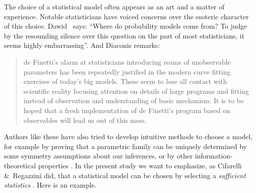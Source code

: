 \documentclass[%
]{frontiersSCNS-nologo} %
\newcommand*{\citey}{\citeyearpar}
\newcommand*{\chap}{ch.} %
\newcommand*{\sect}{\S} %
\newcommand*{\amp}{\&}
\renewcommand*{\|}{\mathpunct{|}}%
\begin{document}
The choice of a statistical model often appears as an art and a matter of
experience. Notable statisticians have voiced concerns over the esoteric
character of this choice. Dawid~\citey[p.~220]{dawid1982} says:
\enquote{Where do probability models come from? To judge by the resounding
  silence over this question on the part of most statisticians, it seems
  highly embarrassing}. And Diaconis \citey[\sect~8, p.~121]{diaconis1988} remarks:
\begin{quotation}
  de Finetti's alarm at statisticians introducing reams of unobservable
  parameters has been repeatedly justified in the modern curve fitting
  exercises of today's big models. These seem to lose all contact with
  scientific reality focusing attention on details of large programs and
  fitting instead of observation and understanding of basic mechanism. It
  is to be hoped that a fresh implementation of de Finetti's program based
  on observables will lead us out of this mess.
\end{quotation}
Authors like these have also tried to develop intuitive methods to choose a
model, for example by proving that a parametric family can be uniquely
determined by some symmetry assumptions about our inferences, or by other
information-theoretical properties
\citetext{\citealp[\chap~4]{bernardoetal1994_r2000};
  \citealp[\sect~5.5]{lindley1965b_r2008}; an enlightening discussion of
  this topic is given by \citealp{dawid2013}}. In the present study we want
to emphasize, as Cifarelli \amp\ Regazzini \citey{cifarellietal1982} did,
that a statistical model can be chosen by selecting a \emph{sufficient
  statistics} \citep[and the textbook references
above]{kolmogorov1942,freedman1962b,diaconisetal1980b,diaconisetal1981,cifarellietal1982,lauritzen1982_r1988,diaconis1992,kallenberg2005}.
Here is an example.
\end{document}
